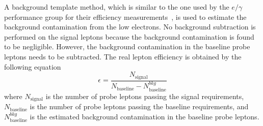 %
A background template method, which is similar to the one used by the $e/\gamma$ performance group for their efficiency measurements~\cite{ATLAS-CONF-2014-018}, is used to estimate the background contamination from the low \pt electrons.
No background subtraction is performed on the signal leptons because the background contamination is found to be negligible.
However, the background contamination in the baseline probe leptons needs to be subtracted.
The real lepton efficiency is obtained by the following equation
%
\begin{equation}
    \epsilon = \frac{N_{\mathrm{signal}}}{N_{\mathrm{baseline}} - N_{\mathrm{baseline}}^{bkg}}
    \label{eq:app_RLE_efficiency_formula}
\end{equation}
%
where $N_\mathrm{signal}$ is the number of probe leptons passing the signal requirements, $N_\mathrm{baseline}$ is the number of probe leptons passing the baseline requirements, and $N_\mathrm{baseline}^{bkg}$ is the estimated background contamination in the baseline probe leptons.


